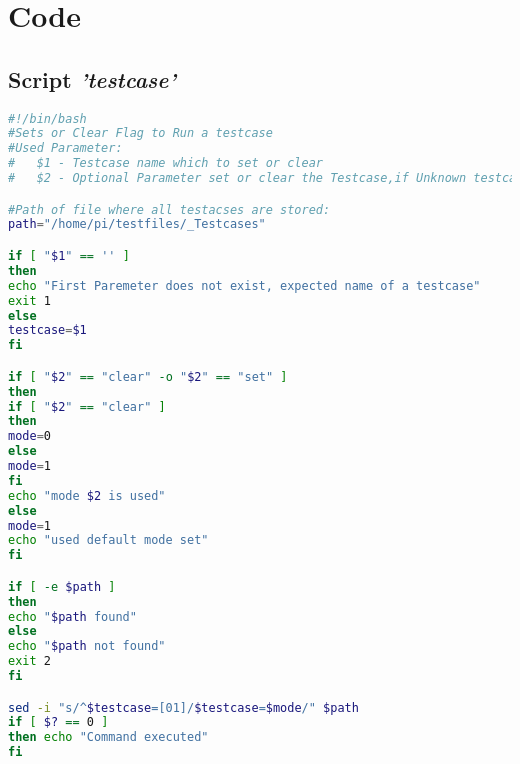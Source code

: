 \chapter{Code}
\label{sec:a-kapitel}


\label{motorH}


\section{Script \textit{'testcase'}}
\label{script_testcase}
\begin{lstlisting}[language=bash]
#!/bin/bash
#Sets or Clear Flag to Run a testcase
#Used Parameter:
#	$1 - Testcase name which to set or clear
#	$2 - Optional Parameter set or clear the Testcase,if Unknown testcase will be set

#Path of file where all testacses are stored:
path="/home/pi/testfiles/_Testcases" 

if [ "$1" == '' ]
then
echo "First Paremeter does not exist, expected name of a testcase"
exit 1
else 
testcase=$1
fi

if [ "$2" == "clear" -o "$2" == "set" ]
then
if [ "$2" == "clear" ] 
then
mode=0
else
mode=1
fi
echo "mode $2 is used" 
else
mode=1
echo "used default mode set"
fi

if [ -e $path ]
then
echo "$path found"
else
echo "$path not found"
exit 2
fi

sed -i "s/^$testcase=[01]/$testcase=$mode/" $path
if [ $? == 0 ]
then echo "Command executed"
fi
\end{lstlisting}
